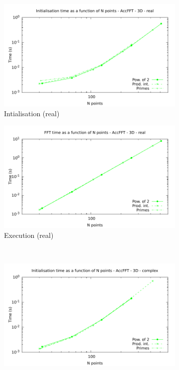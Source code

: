 \documentclass[12pt, a4paper]{article}
\begin{document}
\begin{figure}[H]
\captionsetup{width=0.8\linewidth}
\centering
\begin{subfigure}{.5\textwidth}
\centering
\includegraphics[width=.9\linewidth]{graphs/fft-openacc-3d-pow2-r-init.pdf}
\caption{Intialisation (real)}
\label{FFTACC3DRI}
\end{subfigure}%
\begin{subfigure}{.5\textwidth}
\centering
\includegraphics[width=.9\linewidth]{graphs/fft-openacc-3d-pow2-r-exec.pdf}
\caption{Execution (real)}
\label{FFTACC3DRE}
\end{subfigure}\\
\begin{subfigure}{.5\textwidth}
\centering
\includegraphics[width=.9\linewidth]{graphs/fft-openacc-3d-pow2-c-init.pdf}

\end{subfigure}
\end{figure}
\end{document}
